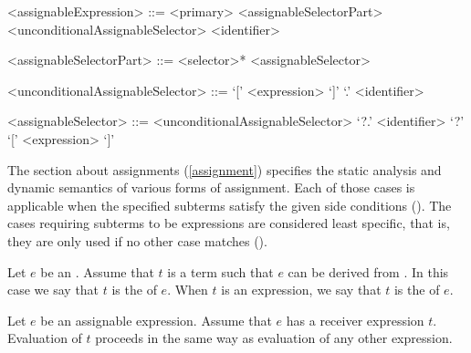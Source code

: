 \documentclass[makeidx]{article}
\begin{document}
{\begin{grammar}
<assignableExpression> ::= <primary> <assignableSelectorPart>
  \alt \SUPER{} <unconditionalAssignableSelector>
  \alt <identifier>

<assignableSelectorPart> ::= <selector>* <assignableSelector>

<unconditionalAssignableSelector> ::= `[' <expression> `]'
  \alt `.' <identifier>

<assignableSelector> ::= <unconditionalAssignableSelector>
  \alt `?.' <identifier>
  \alt `?' `[' <expression> `]'

\end{grammar}

\LMHash{}%
The section about assignments
(\ref{assignment})
specifies the static analysis and dynamic semantics of
various forms of assignment.
Each of those cases is applicable when the specified subterms satisfy
the given side conditions
().
The cases requiring subterms to be expressions are considered least specific,
that is, they are only used if no other case matches
().


\LMHash{}%
%
Let $e$ be an .
Assume that $t$ is a term such that $e$ can be derived from
.
In this case we say that $t$ is the
of $e$.
When $t$ is an expression, we say that $t$ is the
of $e$.


\LMHash{}%
Let $e$ be an assignable expression.
Assume that $e$ has a receiver expression $t$.
Evaluation of $t$ proceeds in the same way as
evaluation of any other expression.


}
\end{document}
